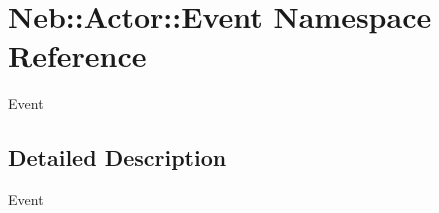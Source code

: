 \hypertarget{namespaceNeb_1_1Actor_1_1Event}{\section{Neb\-:\-:Actor\-:\-:Event Namespace Reference}
\label{namespaceNeb_1_1Actor_1_1Event}
}


Event  




\subsection{Detailed Description}
Event 